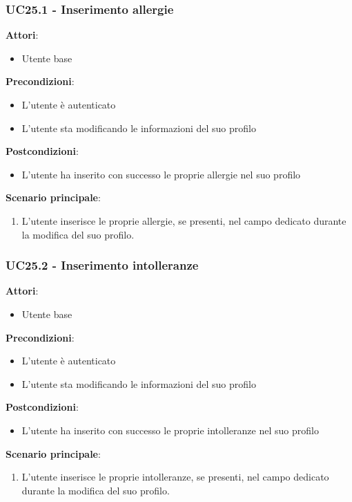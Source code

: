 \subsubsection{UC25.1 - Inserimento allergie}\label{usecase:25_1}
\textbf{Attori}:
\begin{itemize}
    \item Utente base
\end{itemize}
\textbf{Precondizioni}:
\begin{itemize}
    \item L'utente è autenticato
    \item L'utente sta modificando le informazioni del suo profilo
\end{itemize}
\textbf{Postcondizioni}:
\begin{itemize}
    \item L'utente ha inserito con successo le proprie allergie nel suo profilo
\end{itemize}
\textbf{Scenario principale}:
\begin{enumerate}
    \item L'utente inserisce le proprie allergie, se presenti, nel campo dedicato durante la modifica del suo profilo.
\end{enumerate}

\subsubsection{UC25.2 - Inserimento intolleranze}\label{usecase:25_2}
\textbf{Attori}:
\begin{itemize}
    \item Utente base
\end{itemize}
\textbf{Precondizioni}:
\begin{itemize}
    \item L'utente è autenticato
    \item L'utente sta modificando le informazioni del suo profilo
\end{itemize}
\textbf{Postcondizioni}:
\begin{itemize}
    \item L'utente ha inserito con successo le proprie intolleranze nel suo profilo
\end{itemize}
\textbf{Scenario principale}:
\begin{enumerate}
    \item L'utente inserisce le proprie intolleranze, se presenti, nel campo dedicato durante la modifica del suo profilo.
\end{enumerate}

 

\newpage